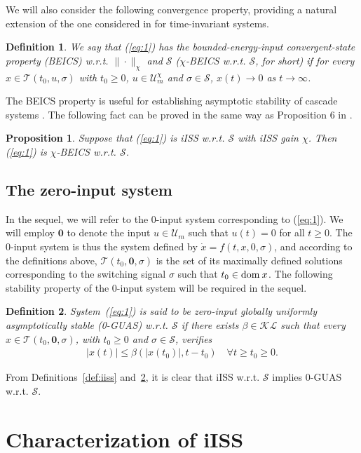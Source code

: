 \documentclass[9pt,final,journal]{IEEEtran}
\newtheorem{defin}{Definition}
\newtheorem{prop}{Proposition}
\def\KL{\mathcal{KL}}
\def\S{\mathcal{S}}
\def\T{\mathcal{T}}
\def\U{\mathcal{U}}
\def\dom{{\rm dom}}
\begin{document}
We will also consider the following convergence property, providing a natural extension of the one considered in \cite{jayrya_tac10} for time-invariant systems. 
%
\begin{defin}
We say that (\ref{eq:1}) has the bounded-energy-input convergent-state property (BEICS) w.r.t. $\|\cdot\|_{\chi}$ and $\S$ ($\chi$-BEICS w.r.t. $\S$, for short) if for every $x\in \T(t_0,u,\sigma)$ with $t_0\ge 0$, $u\in \U_m^{\chi}$ and $\sigma\in \S$, $x(t)\to 0$ as $t\to \infty$. 
\end{defin}
%
The BEICS property is useful for establishing asymptotic stability of cascade systems \cite{arcang_siamjco02}. The following fact can be proved in the same way as Proposition 6 in \cite{sontag_scl98}.
\begin{prop} 
  \label{prop:iISSimpliesBEICS} 
  Suppose that (\ref{eq:1}) is iISS w.r.t. $\S$ with iISS gain $\chi$. Then (\ref{eq:1}) is $\chi$-BEICS w.r.t. $\S$.
 \end{prop}

\subsection{The zero-input system}
\label{sec:zeroinputsys}

In the sequel, we will refer to the 0-input system corresponding to (\ref{eq:1}). We will employ $\mathbf{0}$ to denote the input $u\in\U_m$ such that $u(t) = 0$ for all $t\ge 0$. The 0-input system is thus the system defined by $\dot x = f(t,x,0,\sigma)$, and according to the definitions above, $\T(t_0,\mathbf{0},\sigma)$ is the set of its maximally defined solutions corresponding to the switching signal $\sigma$ such that $t_0 \in \dom\: x$. The following stability property of the 0-input system will be required in the sequel.
\begin{defin}
  \label{def:0guas}
  System~(\ref{eq:1}) is said to be zero-input globally uniformly asymptotically stable (0-GUAS) w.r.t. $\S$ if there exists $\beta\in\KL$ such that every $x\in\T(t_0,\mathbf{0},\sigma)$, with $t_0\ge 0$ and $\sigma\in \S$, verifies
  \begin{align}
    \label{eq:xest0guas}
    |x(t)| \le \beta(|x(t_0)|,t-t_0)\quad\forall t\ge t_0 \ge 0.
  \end{align}
\end{defin}
From Definitions~\ref{def:iiss} and~\ref{def:0guas}, it is clear that iISS w.r.t. $\S$ implies 0-GUAS w.r.t. $\S$.


\section{Characterization of iISS} 
\label{sec:char-iiss}
\end{document}
